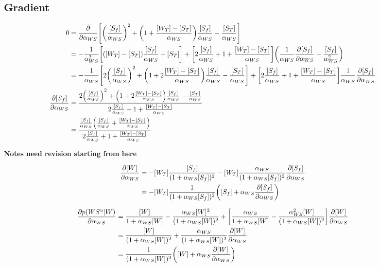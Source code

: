\documentclass[aps,onecolumn,superscriptaddress,notitlepage]{revtex4-1}
\newcommand{\comment}[1]{{\color{blue}#1}}
\begin{document}
\subsection{Gradient}
\begin{align}
0 &= \pdv{}{\alpha_{WS}}\qty[\qty(\frac{[S_f]}{\alpha_{WS}})^2 +  \qty(1+\frac{[W_T]-[S_T]}{\alpha_{WS}})\frac{[S_f]}{\alpha_{WS}} - \frac{[S_T]}{\alpha_{WS}}]\\
&= -\frac{1}{\alpha_{WS}^2}\qty[\qty( [W_T]-[S_T])\frac{[S_f]}{\alpha_{WS}} - [S_T]] + \qty[2 \frac{[S_f]}{\alpha_{WS}} +  1+\frac{[W_T]-[S_T]}{\alpha_{WS}}]\qty(\frac{1}{\alpha_{WS}}\pdv{[S_f]}{\alpha_{WS}} - \frac{[S_f]}{\alpha_{WS}^2})\\
&= -\frac{1}{\alpha_{WS}}\qty[2 \qty(\frac{[S_f]}{\alpha_{WS}})^2 +  \qty(1+2\frac{[W_T]-[S_T]}{\alpha_{WS}})\frac{[S_f]}{\alpha_{WS}}- \frac{[S_T]}{\alpha_{WS}}] + \qty[2 \frac{[S_f]}{\alpha_{WS}} +  1+\frac{[W_T]-[S_T]}{\alpha_{WS}}] \frac{1}{\alpha_{WS}}\pdv{[S_f]}{\alpha_{WS}}\\
\pdv{[S_f]}{\alpha_{WS}} &= \frac{2 \qty(\frac{[S_f]}{\alpha_{WS}})^2 +  \qty(1+2\frac{[W_T]-[S_T]}{\alpha_{WS}})\frac{[S_f]}{\alpha_{WS}}- \frac{[S_T]}{\alpha_{WS}}}{2 \frac{[S_f]}{\alpha_{WS}} +  1+\frac{[W_T]-[S_T]}{\alpha_{WS}}}\\
&= \frac{ \frac{[S_f]}{\alpha_{WS}}\qty(\frac{[S_f]}{\alpha_{WS}}+ \frac{[W_T]-[S_T]}{\alpha_{WS}})}{2 \frac{[S_f]}{\alpha_{WS}} +  1+\frac{[W_T]-[S_T]}{\alpha_{WS}}}
\end{align}

\comment{\textbf{Notes need revision starting from here}}

\begin{align}
\pdv{[W]}{\alpha_{WS}} &= -[W_T]\frac{[S_f]}{(1+\alpha_{WS}[S_f])^2}-[W_T]\frac{\alpha_{WS}}{(1+\alpha_{WS}[S_f])^2}\pdv{[S_f]}{\alpha_{WS}}\\
&= -[W_T]\frac{1}{(1+\alpha_{WS}[S_f])^2}\qty([S_f] + \alpha_{WS}\pdv{[S_f]}{\alpha_{WS}})
\end{align}

\begin{align}
\pdv{p(WS^u|W)}{\alpha_{WS}} &= \frac{[W]}{1+\alpha_{WS}[W]} - \frac{\alpha_{WS}[W]^2}{(1+\alpha_{WS}[W])^2} + \qty[\frac{\alpha_{WS}}{1+\alpha_{WS}[W]} - \frac{\alpha_{WS}^2[W]}{(1+\alpha_{WS}[W])^2}]\pdv{[W]}{\alpha_{WS}}\\
&= \frac{[W]}{(1+\alpha_{WS}[W])^2} + \frac{\alpha_{WS}}{(1+\alpha_{WS}[W])^2}\pdv{[W]}{\alpha_{WS}}\\
&= \frac{1}{(1+\alpha_{WS}[W])^2}\qty([W] + \alpha_{WS}\pdv{[W]}{\alpha_{WS}})
\end{align}
\end{document}
